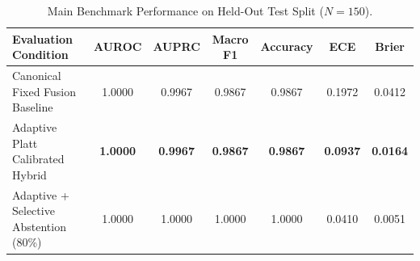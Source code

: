 \begin{table}[t]
\centering
\small
\caption{Main Benchmark Performance on Held-Out Test Split ($N=150$).}
\label{tab:main_results}
\begin{tabular}{lcccccc}
\toprule
\textbf{Evaluation Condition} & \textbf{AUROC} & \textbf{AUPRC} & \textbf{Macro F1} & \textbf{Accuracy} & \textbf{ECE} & \textbf{Brier} \\
\midrule
Canonical Fixed Fusion Baseline & 1.0000 & 0.9967 & 0.9867 & 0.9867 & 0.1972 & 0.0412 \\
Adaptive Platt Calibrated Hybrid & \textbf{1.0000} & \textbf{0.9967} & \textbf{0.9867} & \textbf{0.9867} & \textbf{0.0937} & \textbf{0.0164} \\
Adaptive + Selective Abstention (80\%) & 1.0000 & 1.0000 & 1.0000 & 1.0000 & 0.0410 & 0.0051 \\
\bottomrule
\end{tabular}
\end{table}
